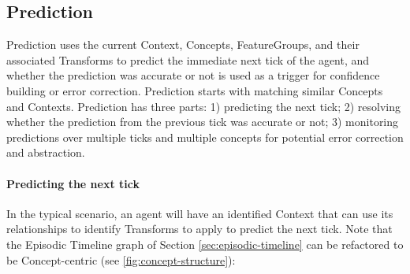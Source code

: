\documentclass{article}
\begin{document}
\citep{ryan_frankland_2022, underwood_1957, oleary_natural_2024, bjork_bjork_1992}

\subsection{Prediction}\label{sec:prediction}
Prediction uses the current Context, Concepts, FeatureGroups, and their associated Transforms to predict the immediate next tick of the agent, and whether the prediction was accurate or not is used as a trigger for confidence building or error correction. Prediction starts with matching similar Concepts and Contexts. Prediction has three parts: 1) predicting the next tick; 2) resolving whether the prediction from the previous tick was accurate or not; 3) monitoring predictions over multiple ticks and multiple concepts for potential error correction and abstraction.

\paragraph{Predicting the next tick}
In the typical scenario, an agent will have an identified Context that can use its relationships to identify Transforms to apply to predict the next tick. Note that the Episodic Timeline graph of Section \ref{sec:episodic-timeline} can be refactored to be Concept-centric (see \ref{fig:concept-structure}):
\end{document}
